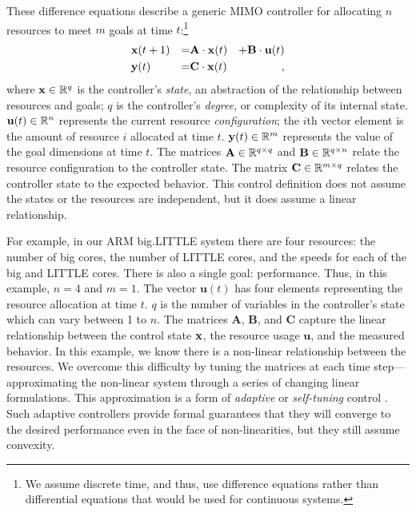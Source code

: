 These difference equations describe a generic MIMO controller for
allocating $n$ resources to meet $m$ goals at time $t$:\footnote{We
  assume discrete time, and thus, use difference equations rather than
  differential equations that would be used for continuous systems.}
\begin{equation}
\begin{aligned}
&\mathbf{x}(t+1) &=& \mathbf{A} \cdot \mathbf{x}(t)& + \mathbf{B} \cdot \mathbf{u}(t)\\
&\mathbf{y}(t)   &=& \mathbf{C} \cdot \mathbf{x}(t)&,
\end{aligned}
\label{eqn:system:mimo}
\end{equation}
where $\mathbf{x} \in \mathbb{R}^{q}$ is the controller's \emph{state}, an abstraction
of the relationship between resources and goals; $q$ is the
controller's \emph{degree}, or complexity of its internal state.
$\mathbf{u}(t) \in \mathbb{R}^n$ represents the current resource
\emph{configuration}; \ie{} the $i$th vector element is the amount of
resource $i$ allocated at time $t$.  $\mathbf{y}(t) \in \mathbb{R}^{m}$ represents the
value of the goal dimensions at time $t$. The matrices $\mathbf{A} \in
\mathbb{R}^{q \times q}$ and $\mathbf{B} \in \mathbb{R}^{q \times n}$ relate the
resource configuration to the controller state.  The matrix
$\mathbf{C} \in \mathbb{R}^{m \times q}$ relates the controller state to the
expected behavior.  This control definition does not assume the states
or the resources are independent, but it does assume a linear
relationship.

For example, in our ARM big.LITTLE system there are four resources:
the number of big cores, the number of LITTLE cores, and the speeds
for each of the big and LITTLE cores.  There is also a single goal:
performance.  Thus, in this example, $n=4$ and $m=1$. The vector
$\mathbf{u}(t)$ has four elements representing the resource allocation
at time $t$. $q$ is the number of variables in the controller's state
which can vary between 1 to $n$.  The matrices $\mathbf{A}$,
$\mathbf{B}$, and $\mathbf{C}$ capture the linear relationship between
the control state $\mathbf{x}$, the resource usage $\mathbf{u}$, and the
measured behavior.  In this example, we know there is a non-linear
relationship between the resources.  We overcome this difficulty by
tuning the matrices at each time step---approximating the non-linear
system through a series of changing linear formulations.  This
approximation is a form of \emph{adaptive} or \emph{self-tuning}
control \cite{HandbookControl}.  Such adaptive controllers provide
formal guarantees that they will converge to the desired performance
even in the face of non-linearities, but they still assume convexity.

